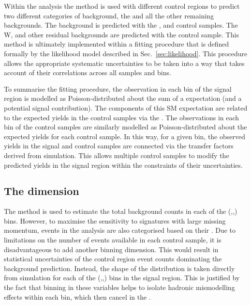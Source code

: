 Within the analysis the \TF method is used with different control
regions to predict two different categories of background, the \znunu
and all the other remaining backgrounds. The \znunu background is
predicted with the \mmj, \gj and \mj control samples. The W, \ttbar and other residual
backgrounds are predicted with the \mj control sample. This method is
ultimately implemented within a fitting procedure that is defined
formally by the likelihood model described in
Sec.~\ref{sec:likelihood}. This procedure allows the appropriate
systematic uncertainties to be taken into a way that takes account of
their correlations across all samples and bins.

To summarise the fitting procedure, the observation in each bin of the
signal region is modelled as Poisson-distributed about the sum of a
\SM expectation (and a potential signal contribution). The components
of this SM expectation are related to the expected yields in the
control samples via the \TFs. The observations in each bin of the
control samples are similarly modelled as Poisson-distributed about
the expected yields for each control sample. In this way, for a given
bin, the observed yields in the signal and control samples are
connected via the transfer factors derived from simulation.  This
allows multiple control samples to modify the predicted yields in the
signal region within the constraints of their uncertainties.

\subsection{The \MHT dimension}
\label{sec:mhtDim}

The \TF method is used to estimate the total background counts in each
of the (\HT,\nj,\nb) bins. However, to maximise the sensitivity to
\BSM signatures with large missing momentum, events in the analysis are also
categorised based on their \MHT. Due to limitations on the
number of events available in each control sample, it is
disadvantageous to add another binning
dimension. This would result in statistical uncertainties of the
control region event counts dominating the background prediction.
Instead, the shape of the \MHT distribution is taken directly from
simulation for each of the (\HT,\nj,\nb) bins in the signal region.
This is justified by the fact that binning in these variables helps to
isolate hadronic mismodelling effects within each bin, which then
cancel in the \TFs. 

